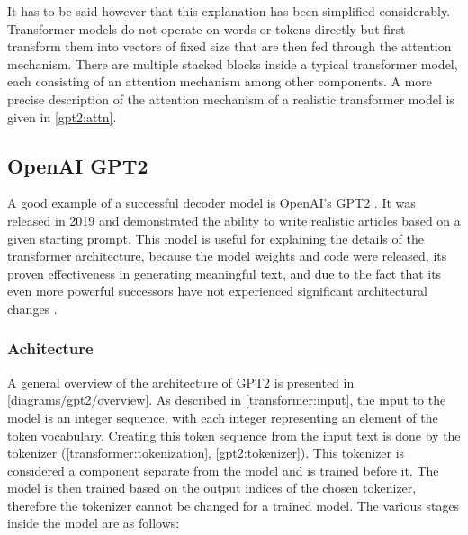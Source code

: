 It has to be said however that this explanation has been simplified considerably. Transformer models do not operate on words or tokens directly but first transform them into vectors of fixed size that are then fed through the attention mechanism. There are multiple stacked blocks inside a typical transformer model, each consisting of an attention mechanism among other components. A more precise description of the attention mechanism of a realistic transformer model is given in \cref{gpt2:attn}.

\subsection{OpenAI GPT2}
\label{gpt2}

A good example of a successful decoder model is OpenAI's GPT2 \cite{unsupervisedmultitask} \cite{OpenAI2019BetterLM} \cite[source code]{HuggingFaceGPT2}. It was released in 2019 and demonstrated the ability to write realistic articles based on a given starting prompt. This model is useful for explaining the details of the transformer architecture, because the model weights and code were released, its proven effectiveness in generating meaningful text, and due to the fact that its even more powerful successors have not experienced significant architectural changes \cite{OpenGenus2023GPTComparison}.

\subsubsection{Achitecture}

A general overview of the architecture of GPT2 is presented in \cref{diagrams/gpt2/overview}.
As described in \cref{transformer:input}, the input to the model is an integer sequence, with each integer representing an element of the token vocabulary.
Creating this token sequence from the input text is done by the tokenizer (\cref{transformer:tokenization}, \cref{gpt2:tokenizer}). This tokenizer is considered a component separate from the model and is trained before it. The model is then trained based on the output indices of the chosen tokenizer, therefore the tokenizer cannot be changed for a trained model. The various stages inside the model are as follows:

